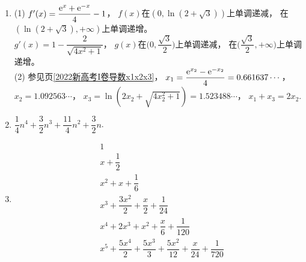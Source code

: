 \begin{enumerate}[label={\textbf{\thechapter.\arabic*}},leftmargin=
    \inteval{\myenumleftmargin}pt]
读者是否注意到，$ f(x) $满足函数方程：
$ f\left(\dfrac{1}{x}\right)=-f(x) $ \\
(2)\ $ \ln x_0=\dfrac{x_0+1}{x_0-1}\q \mycircled{1} $，
第(2)问与2018年的天津高考题是类似的，让我们进行逆向分析，
设与$ y=\e^x $相切的切点坐标是$ (x_1,\e^{x_1}) $，
那么
\begin{gather*}
    \dfrac{1}{x_0}=\e^{x_1}=\dfrac{\ln x_0-\e^{x_1}}{x_0-x_1}
\end{gather*}
设法消去$ x_1 $，将$ \e^{x_1}=\dfrac{1}{x_0},\ x_1=-\ln x_0 $代入
\begin{gather*}
    \dfrac{1}{x_0}=\dfrac{\ln x_0-\e^{x_1}}{x_0-x_1}
\end{gather*}
可得
\begin{gather*}
    \dfrac{1}{x_0}=\dfrac{\ln x_0-\frac{1}{x_0}}{x_0+\ln x_0}
\end{gather*}
整理后即得式。

\item (1) $ f'(x)=\dfrac{\mathrm{e}^x+\mathrm{e}^{-x}}{4}-1 $，
$ f(x) $在$ (0,\ln(2+\sqrt{3})) $上单调递减，
在$ (\ln(2+\sqrt{3}),+\infty) $上单调递增。\\
$ g'(x)=1-\dfrac{2}{\sqrt{4x^2+1}} $，
$ g(x) $在$ \Big(0,\dfrac{\sqrt{3}}{2}\Big) $上单调递减，
在$ \Big(\dfrac{\sqrt{3}}{2},+\infty\Big) $上单调递增。\\
(2) 参见\pageref{2022新高考I卷导数x1x2x3}页\ref{2022新高考I卷导数x1x2x3}，
$ x_1=\dfrac{\mathrm{e}^{x_2}-\mathrm{e}^{-x_2}}{4}=0.661637\cdots $，\\
$ x_2=1.092563\cdots $，
$ x_3=\ln(2x_2+\sqrt{4x_2^2+1})=1.523488\cdots $，
$ x_1+x_3=2x_2 $.

\item 
$ \dfrac{1}{4}n^4+\dfrac{3}{2}n^3+\dfrac{11}{4}n^2+\dfrac{3}{2}n $.

\item 
\begin{align*}
    & 1                                             \\
    & x+\dfrac{1}{2}                                \\
    & x^2+x+\dfrac{1}{6}                            \\
    & x^3+\dfrac{3x^2}{2}+\dfrac{x}{2}+\dfrac{1}{24}\\
    & x^4+2x^3+x^2+\dfrac{x}{6}+\dfrac{1}{120}		\\	
    & x^5+\dfrac{5x^4}{2}+\dfrac{5x^3}{3}+\dfrac{5x^2}{12}+
    \dfrac{x}{24}+\dfrac{1}{720}
\end{align*} 


\end{enumerate}
